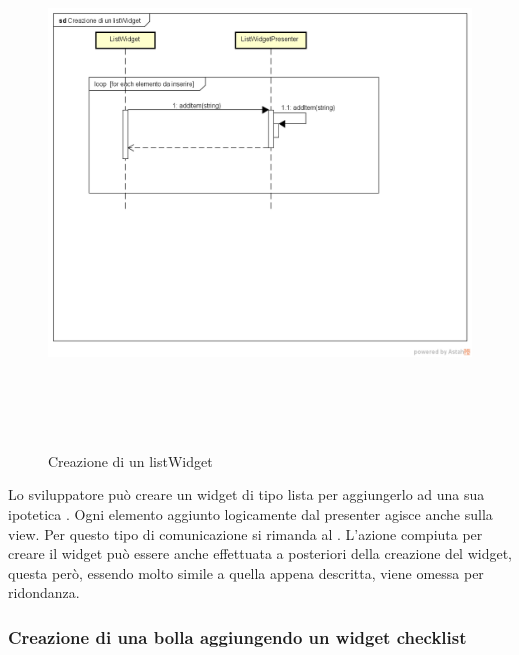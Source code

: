 \label{Click di un bottone}
\begin{figure}[ht]
	\centering
	\includegraphics[width=16cm, height=14cm]{Sezioni/Diagrammi/img/Creazione di un listWidget.png}
	\caption{Creazione di un listWidget}
\end{figure}

Lo sviluppatore può creare un widget di tipo lista per aggiungerlo ad una sua ipotetica . Ogni elemento aggiunto logicamente dal presenter agisce anche sulla view. Per questo tipo di comunicazione si rimanda al  .
L'azione compiuta per creare il widget può essere anche effettuata a posteriori della creazione del widget, questa però, essendo molto simile a quella appena descritta, viene omessa per ridondanza.

\newpage

\subsubsection{Creazione di una bolla aggiungendo un widget checklist}

